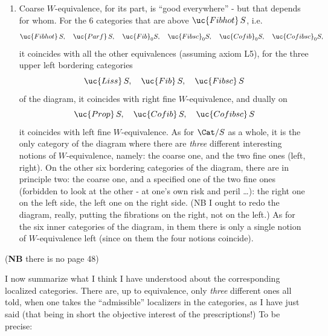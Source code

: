 \begin{enumerate}[leftmargin=*]
\item[3)] Coarse $W$-equivalence, for its part, is ``good everywhere'' - but that depends for whom. For the 6 categories that are above $\uc{Fibhot}\,S$, i.e.
\[
\uc{Fibhot}\,S,\quad \uc{Parf}\,S,\quad \uc{Fib}_0S,\quad \uc{Fibsc}_0S,\quad \uc{Cofib}_0S,\quad \uc{Cofibsc}_0S,
\]
it coincides with all the other equivalences (assuming axiom L5), for the three upper left bordering categories %
\[
\uc{Liss}\,S,\quad \uc{Fib}\,S,\quad \uc{Fibsc}\,S
\]
of the diagram, it coincides with right fine $W$-equivalence, and dually on
\[
\uc{Prop}\,S,\quad \uc{Cofib}\,S,\quad \uc{Cofibsc}\,S
\]
it coincides with left fine $W$-equivalence. As for $\Cat/S$ as a whole, it is the only category of the diagram where there are \textit{three} different interesting notions of $W$-equivalence, namely: the coarse one, and the two fine ones (left, right). On the other six bordering categories of the diagram, there are in principle two: the coarse one, and a specified one of the two fine ones (forbidden to look at the other - at one's own risk and peril \ldots): the right one on the left side, the left one on the right side. (NB I ought to redo the diagram, really, putting the fibrations on the right, not on the left.) As for the six inner categories of the diagram, in them there is only a single notion of $W$-equivalence left (since on them the four notions coincide).
\end{enumerate}


 (\textbf{NB} there is no page 48)

I now summarize what I think I have understood about the corresponding localized categories. There are, up to equivalence, only \textit{three} different ones all told, when one takes the ``admissible'' localizers in the categories, as I have just said (that being in short the objective interest of the prescriptions!) To be precise:


